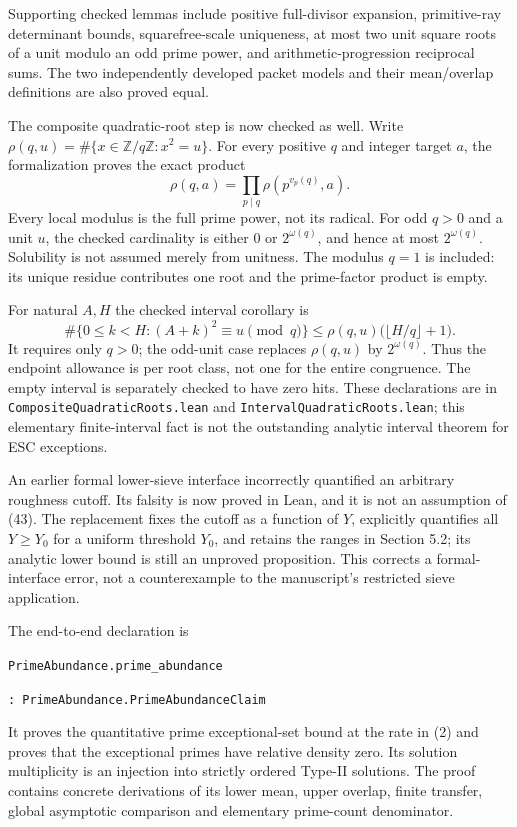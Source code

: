 \documentclass[
  english,
  11pt,
]{article}
\begin{document}
Supporting checked lemmas include positive full-divisor expansion,
primitive-ray determinant bounds, squarefree-scale uniqueness, at most
two unit square roots of a unit modulo an odd prime power, and
arithmetic-progression reciprocal sums. The two independently developed
packet models and their mean/overlap definitions are also proved equal.

The composite quadratic-root step is now checked as well. Write
\(\rho(q,u)=\#\{x\in\mathbb Z/q\mathbb Z:x^2=u\}\). For every positive
\(q\) and integer target \(a\), the formalization proves the exact
product \[
\rho(q,a)=\prod_{p\mid q}\rho(p^{v_p(q)},a).
\] Every local modulus is the full prime power, not its radical. For odd
\(q>0\) and a unit \(u\), the checked cardinality is either \(0\) or
\(2^{\omega(q)}\), and hence at most \(2^{\omega(q)}\). Solubility is
not assumed merely from unitness. The modulus \(q=1\) is included: its
unique residue contributes one root and the prime-factor product is
empty.

For natural \(A,H\) the checked interval corollary is \[
\#\{0\le k<H:(A+k)^2\equiv u\pmod q\}
\le \rho(q,u)\bigl(\lfloor H/q\rfloor+1\bigr).
\] It requires only \(q>0\); the odd-unit case replaces \(\rho(q,u)\) by
\(2^{\omega(q)}\). Thus the endpoint allowance is per root class, not
one for the entire congruence. The empty interval is separately checked
to have zero hits. These declarations are in
\texttt{CompositeQuadraticRoots.lean} and
\texttt{IntervalQuadraticRoots.lean}; this elementary finite-interval
fact is not the outstanding analytic interval theorem for ESC
exceptions.

An earlier formal lower-sieve interface incorrectly quantified an
arbitrary roughness cutoff. Its falsity is now proved in Lean, and it is
not an assumption of (43). The replacement fixes the cutoff as a
function of \(Y\), explicitly quantifies all \(Y\ge Y_0\) for a uniform
threshold \(Y_0\), and retains the ranges in Section 5.2; its analytic
lower bound is still an unproved proposition. This corrects a
formal-interface error, not a counterexample to the manuscript's
restricted sieve application.

The end-to-end declaration is
\begin{center}
\texttt{PrimeAbundance.prime\_abundance}\par
\texttt{: PrimeAbundance.PrimeAbundanceClaim}
\end{center}
It proves the quantitative prime
exceptional-set bound at the rate in (2) and proves that the exceptional
primes have relative density zero. Its solution multiplicity is an
injection into strictly ordered Type-II solutions. The proof contains
concrete derivations of its lower mean, upper overlap, finite transfer,
global asymptotic comparison and elementary prime-count denominator.
\end{document}
